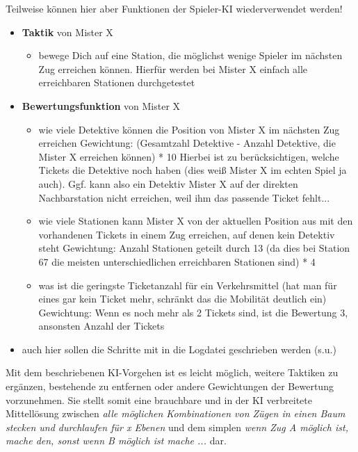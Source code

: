         Teilweise können hier aber Funktionen der Spieler-KI wiederverwendet werden!
        \begin{itemize}
            \item \textbf{Taktik} von Mister X
                \begin{itemize}
                    \item bewege Dich auf eine Station, die möglichst wenige Spieler im nächsten Zug erreichen können. Hierfür werden bei Mister X einfach alle erreichbaren Stationen durchgetestet
                \end{itemize}
            \item \textbf{Bewertungsfunktion} von Mister X
                \begin{itemize}
                    \item wie viele Detektive können die Position von Mister X im nächsten Zug erreichen
                    Gewichtung: (Gesamtzahl Detektive - Anzahl Detektive, die Mister X erreichen können) * 10
                    Hierbei ist zu berücksichtigen, welche Tickets die Detektive noch haben (dies weiß Mister X im echten Spiel ja auch). Ggf. kann also ein Detektiv Mister X auf der direkten Nachbarstation nicht erreichen, weil ihm das passende Ticket fehlt...
                    \item wie viele Stationen kann Mister X von der aktuellen Position aus mit den vorhandenen Tickets in einem Zug erreichen, auf denen kein Detektiv steht
                    Gewichtung: Anzahl Stationen geteilt durch 13 (da dies bei Station 67 die meisten unterschiedlichen erreichbaren Stationen sind) * 4
                    \item was ist die geringste Ticketanzahl für ein Verkehrsmittel (hat man für eines gar kein Ticket mehr, schränkt das die Mobilität deutlich ein)
                    Gewichtung: Wenn es noch mehr als 2 Tickets sind, ist die Bewertung 3, ansonsten Anzahl der Tickets
                \end{itemize}
            \item auch hier sollen die Schritte mit in die Logdatei geschrieben werden (s.u.)
        \end{itemize}
        Mit dem beschriebenen KI-Vorgehen ist es leicht möglich, weitere Taktiken zu ergänzen, bestehende zu entfernen oder andere Gewichtungen der Bewertung vorzunehmen.
        Sie stellt somit eine brauchbare und in der KI verbreitete Mittellösung zwischen \textit{alle möglichen Kombinationen von Zügen in einen Baum stecken und durchlaufen für x Ebenen} und dem simplen \textit{wenn Zug A möglich ist, mache den, sonst wenn B möglich ist mache ...} dar. 

